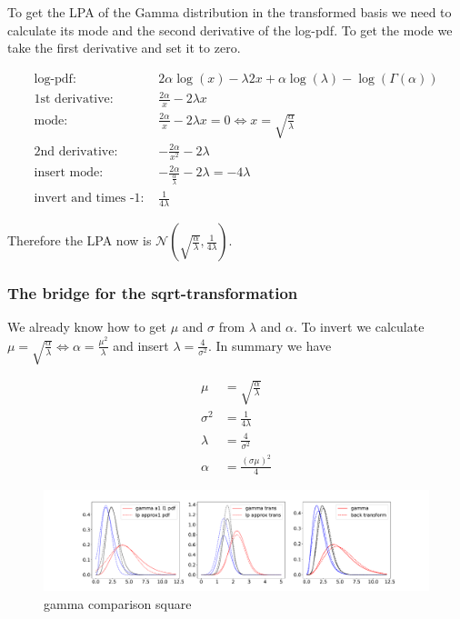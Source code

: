 To get the LPA of the Gamma distribution in the transformed basis we need to calculate its mode and the second derivative of the log-pdf. To get the mode we take the first derivative and set it to zero. 

\begin{align*}
\text{log-pdf: } &2\alpha \log(x) - \lambda 2x + \alpha \log(\lambda) - \log(\Gamma(\alpha)) \\
\text{1st derivative: }&  \frac{2\alpha}{x} - 2\lambda x\\
\text{mode: }& \frac{2\alpha}{x} - 2\lambda x = 0 \Leftrightarrow x = \sqrt{\frac{\alpha}{\lambda}}\\
\text{2nd derivative: }&  -\frac{2\alpha}{x^2} - 2\lambda\\
\text{insert mode: }& -\frac{2\alpha}{\frac{\alpha}{\lambda}} - 2\lambda = -4\lambda\\
\text{invert and times -1: }& \frac{1}{4\lambda}
\end{align*}

Therefore the LPA now is $\mathcal{N}\left(\sqrt{\frac{\alpha}{\lambda}}, \frac{1}{4\lambda} \right)$.

\subsubsection{The bridge for the sqrt-transformation}

We already know how to get $\mu$ and $\sigma$ from $\lambda$ and $\alpha$. To invert we calculate $\mu = \sqrt{\frac{\alpha}{\lambda}} \Leftrightarrow \alpha = \frac{\mu^2}{\lambda}$ and insert $\lambda=\frac{4}{\sigma^2}$. In summary we have

\begin{align}
\mu &= \sqrt{\frac{\alpha}{\lambda}} \\
\sigma^2 &= \frac{1}{4\lambda} \\
\lambda &= \frac{4}{\sigma^2} \\
\alpha &= \frac{(\sigma\mu)^2}{4} 
\end{align}

\begin{figure}[!htb]
	\centering
	\includegraphics[width=\textwidth]{figures/gamma_playground_sqrt.pdf}
	\caption{gamma comparison square}
	\label{fig:gamma_comparison_square}
\end{figure}

